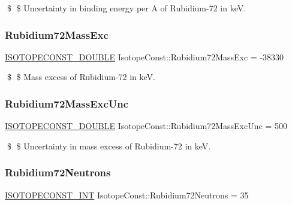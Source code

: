 \$ \$ Uncertainty in binding energy per A of Rubidium-\/72 in keV. \mbox{\label{group___isotope_const-_rubidium-_rb72_ga8fa0fa4daa4508c0aa4ea74aff093835}} 
\subsubsection{\texorpdfstring{Rubidium72\+Mass\+Exc}{Rubidium72MassExc}}
{\footnotesize\ttfamily \mbox{\hyperlink{group___isotope_const-_macros_ga8f45a7272ce02c0b4c65c44636ed719a}{I\+S\+O\+T\+O\+P\+E\+C\+O\+N\+S\+T\+\_\+\+D\+O\+U\+B\+LE}} Isotope\+Const\+::\+Rubidium72\+Mass\+Exc = -\/38330}

\$ \$ Mass excess of Rubidium-\/72 in keV. \mbox{\label{group___isotope_const-_rubidium-_rb72_ga6f414f5babbebd28bea8f30b6f0f7f62}} 
\subsubsection{\texorpdfstring{Rubidium72\+Mass\+Exc\+Unc}{Rubidium72MassExcUnc}}
{\footnotesize\ttfamily \mbox{\hyperlink{group___isotope_const-_macros_ga8f45a7272ce02c0b4c65c44636ed719a}{I\+S\+O\+T\+O\+P\+E\+C\+O\+N\+S\+T\+\_\+\+D\+O\+U\+B\+LE}} Isotope\+Const\+::\+Rubidium72\+Mass\+Exc\+Unc = 500}

\$ \$ Uncertainty in mass excess of Rubidium-\/72 in keV. \mbox{\label{group___isotope_const-_rubidium-_rb72_ga53dc187db2b5f9fd2dd40530c16d9fa7}} 
\subsubsection{\texorpdfstring{Rubidium72\+Neutrons}{Rubidium72Neutrons}}
{\footnotesize\ttfamily \mbox{\hyperlink{group___isotope_const-_macros_ga5f18360b3e99483a35c32d789e62621c}{I\+S\+O\+T\+O\+P\+E\+C\+O\+N\+S\+T\+\_\+\+I\+NT}} Isotope\+Const\+::\+Rubidium72\+Neutrons = 35}

